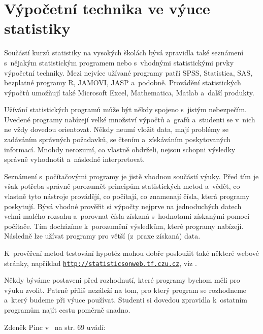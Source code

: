 \section{Výpočetní technika ve výuce statistiky}

Součástí kurzů statistiky na vysokých školách bývá zpravidla také seznámení s~nějakým statistickým programem nebo s~vhodnými statistickými prvky
výpočetní techniky. Mezi nejvíce užívané programy patří SPSS, Statistica, SAS, bezplatné programy R, JAMOVI, JASP a~podobně. Provádění  statistických
výpočtů umožňují také Microsoft Excel, Mathematica, Matlab a~další produkty.

Užívání statistických programů může být někdy spojeno s~jistým nebezpečím.
Uvedené programy nabízejí velké množství výpočtů a~grafů a~studenti se v~nich ne vždy dovedou orientovat. Někdy neumí vložit data, mají problémy se zadáváním správných požadavků,
se čtením a~získáváním poskytovaných informací.
 Mnohdy nerozumí, co vlastně obdrželi, nejsou schopni výsledky správně vyhodnotit a~následně interpretovat.

 Seznámení s~počítačovými programy je jistě vhodnou součástí výuky.
   Před tím je však potřeba správně porozumět principům statistických metod a~vědět, co vlastně tyto nástroje
provádějí, co počítají, co znamenají čísla, která programy poskytují.
Bývá vhodné prověřit si výpočty nejprve na jednoduchých datech velmi malého rozsahu a~porovnat čísla získaná 
s~hodnotami získanými pomocí počítače. Tím docházíme k~porozumění výsledkům, které programy nabízejí. Následně lze užívat programy
pro větší  (z~praxe získaná) data.

K~prověření metod testování hypotéz mohou dobře posloužit také některé webové stránky, například
\href{http://statisticsonweb.tf.czu.cz/}{\tt http://statisticsonweb.tf.czu.cz}, viz \cite{6}.

Někdy býváme postaveni před rozhodnutí, které programy bychom měli pro výuku zvolit. Patrně příliš nezáleží na tom, pro který
program se rozhodneme a~který budeme při výuce používat. Studenti si dovedou zpravidla k~ostatním
programům najít cestu poměrně snadno. 

Zdeněk Pinc v~\cite{8} na str. 69 uvádí: 

